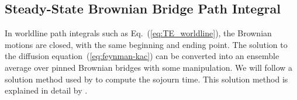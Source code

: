 \subsection{Steady-State Brownian Bridge Path Integral}

In worldline path integrals such as Eq.~(\ref{eq:TE_worldline}), 
the Brownian motions are closed, with the same beginning and ending point.  
The solution to the diffusion equation~(\ref{eq:feynman-kac}) can be converted into an 
ensemble average over pinned Brownian bridges  with some manipulation.
We will follow a solution method used by \citet{Hooghiemstra2002} to compute the sojourn time.  
This solution method is explained in detail by \citet[sections~17.9--17.11]{SteckNotes}.


